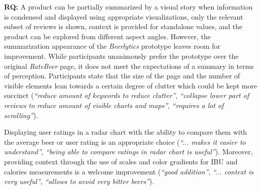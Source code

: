 \noindent
\textbf{RQ:} A product can be partially summarized by a visual story when information is condensed and displayed using appropriate visualizations, only the relevant subset of reviews is shown, context is provided for standalone values, and the product can be explored from different aspect angles.
However, the summarization appearance of the \textit{Beerlytics} prototype leaves room for improvement.
While participants unanimously prefer the prototype over the original \textit{RateBeer} page, it does not meet the expectations of a summary in terms of perception.
Participants state that the size of the page and the number of visible elements lean towards a certain degree of clutter which could be kept more succinct (\emph{``reduce amount of keywords to reduce clutter''}, \emph{``collapse lower part of reviews to reduce amount of visible charts and maps''}, \emph{``requires a lot of scrolling''}).

Displaying user ratings in a radar chart with the ability to compare them with the average beer or user rating is an appropriate choice (\emph{``... makes it easier to understand''}, \emph{``being able to compare ratings in radar chart is useful''}).
Moreover, providing context through the use of scales and color gradients for IBU and calories measurements is a welcome improvement (\emph{``good addition''}, \emph{``... context is very useful''}, \emph{``allows to avoid very bitter beers''}).